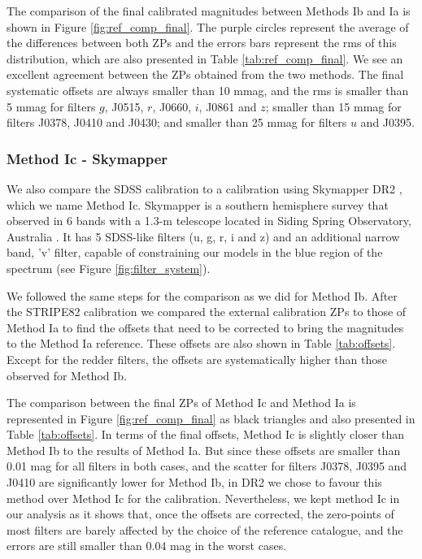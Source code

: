 \documentclass[fleqn,usenatbib]{mnras}
\begin{document}
The comparison of the final calibrated magnitudes between Methods Ib and Ia is shown in Figure \ref{fig:ref_comp_final}. The purple circles represent the average of the differences between both ZPs and the errors bars represent the rms of this distribution, which are also presented in Table \ref{tab:ref_comp_final}. We see an excellent agreement between the ZPs obtained from the two methods. The final systematic offsets are always smaller than 10 mmag, and the rms is smaller than 5 mmag for filters $g$, J0515, $r$, J0660, $i$, J0861 and $z$; smaller than 15 mmag for filters J0378, J0410 and J0430; and smaller than 25 mmag for filters $u$ and J0395.

\subsubsection{Method Ic - Skymapper}

We also compare the SDSS calibration to a calibration using Skymapper DR2 \citep{Onken+2019}, which we name Method Ic. Skymapper is a southern hemisphere survey that observed in 6 bands with a 1.3-m telescope located in Siding Spring Observatory, Australia \citep{Keller+2007}. It has 5 SDSS-like filters (u, g, r, i and z) and an additional narrow band, 'v' filter, capable of constraining our models in the blue region of the spectrum (see Figure \ref{fig:filter_system}).

We followed the same steps for the comparison as we did for Method Ib. After the STRIPE82 calibration we compared the external calibration ZPs to those of Method Ia to find the offsets that need to be corrected to bring the magnitudes to the Method Ia reference. These offsets are also shown in Table \ref{tab:offsets}. Except for the redder filters, the offsets are systematically higher than those observed for Method Ib.

The comparison between the final ZPs of Method Ic and Method Ia is represented in Figure \ref{fig:ref_comp_final} as black triangles and also presented in Table \ref{tab:offsets}. In terms of the final offsets, Method Ic is slightly closer than Method Ib to the results of Method Ia. But since these offsets are smaller than 0.01 mag for all filters in both cases, and the scatter for filters J0378, J0395 and J0410 are significantly lower for Method Ib, in DR2 we chose to favour this method over Method Ic for the calibration. Nevertheless, we kept method Ic in our analysis as it shows that, once the offsets are corrected, the zero-points of most filters are barely affected by the choice of the reference catalogue, and the errors are still smaller than 0.04 mag in the worst cases. 
\end{document}
